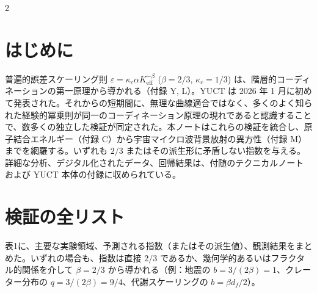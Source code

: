 \documentclass[11pt,a4paper]{article}
\newcommand{\eps}{\varepsilon}
\newcommand{\kappac}{\kappa_c}
\newcommand{\Keff}{K_{\mathrm{eff}}}
\newcommand{\betaf}{\beta}
\begin{document}
	\vspace{0.4cm}
	\vspace*{-\baselineskip}
	\begin{multicols}{2}
		
		\section{はじめに}
		
		普遍的誤差スケーリング則 \(\eps = \kappac \alpha \Keff^{-\betaf}\) (\(\betaf = 2/3\), \(\kappac = 1/3\)) は、階層的コーディネーションの第一原理から導かれる（付録 Y, L）。YUCT は 2026 年 1 月に初めて発表された。それからの短期間に、無理な曲線適合ではなく、多くのよく知られた経験的冪乗則が同一のコーディネーション原理の現れであると認識することで、数多くの独立した検証が同定された。本ノートはこれらの検証を統合し、原子結合エネルギー（付録 C）から宇宙マイクロ波背景放射の異方性（付録 M）までを網羅する。いずれも \(2/3\) またはその派生形に矛盾しない指数を与える。詳細な分析、デジタル化されたデータ、回帰結果は、付随のテクニカルノート \cite{TN1,TN2,TN3,TN4,TN5} および YUCT 本体の付録に収められている。
		
		\section{検証の全リスト}
		
		表1に、主要な実験領域、予測される指数（またはその派生値）、観測結果をまとめた。いずれの場合も、指数は直接 \(2/3\) であるか、幾何学的あるいはフラクタル的関係を介して \(\betaf = 2/3\) から導かれる（例：地震の \(b = 3/(2\betaf) = 1\)、クレーター分布の \(q = 3/(2\betaf) = 9/4\)、代謝スケーリングの \(b = \betaf d_f/2\)）。
		

\end{multicols}
\end{document}
